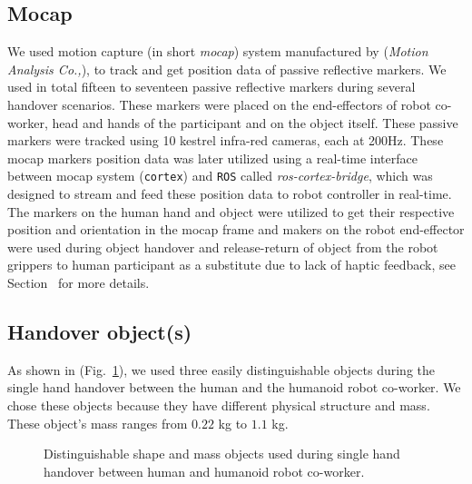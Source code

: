 \subsection{Mocap}
We used motion capture (in short \textit{mocap}) system manufactured by ({\it Motion Analysis Co.,}), to track and get position data of passive reflective markers. We used in total fifteen to seventeen passive reflective markers during several handover scenarios. These markers were placed on the end-effectors of robot co-worker, head and hands of the participant and on the object itself. These passive markers were tracked using 10 kestrel infra-red cameras, each at 200Hz. These mocap markers position data was later utilized using a real-time interface between mocap system (\texttt{cortex}) and \texttt{ROS} called \textit{ros-cortex-bridge}, which was designed to stream and feed these position data to robot controller in real-time. The markers on the human hand and object were utilized to get their respective position and orientation in the mocap frame and makers on the robot end-effector were used during object handover and release-return of object from  the robot grippers to human participant as a substitute due to lack of haptic feedback, see Section~ for more details.

\subsection{Handover object(s)}

As shown in (Fig.~\ref{fig:objects}), we used three easily distinguishable objects during the single hand handover between the human and the humanoid robot co-worker. We chose these objects because they have different physical structure and mass. These object's mass ranges from $0.22$ kg to $1.1$ kg.


\begin{figure}[htpb]
	\caption{Distinguishable shape and mass objects used during single hand handover between human and humanoid robot co-worker.}
	\label{fig:objects}
\end{figure}


